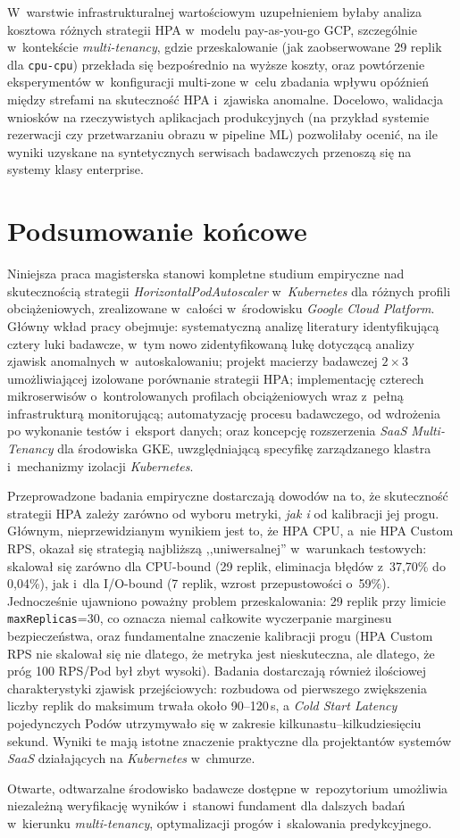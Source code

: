 W~warstwie infrastrukturalnej wartościowym uzupełnieniem byłaby analiza kosztowa różnych strategii HPA w~modelu pay-as-you-go GCP, szczególnie w~kontekście \textit{multi-tenancy}, gdzie przeskalowanie (jak zaobserwowane 29 replik dla \texttt{cpu-cpu}) przekłada się bezpośrednio na wyższe koszty, oraz powtórzenie eksperymentów w~konfiguracji multi-zone w~celu zbadania wpływu opóźnień między strefami na skuteczność HPA i~zjawiska anomalne. Docelowo, walidacja wniosków na rzeczywistych aplikacjach produkcyjnych (na przykład systemie rezerwacji czy przetwarzaniu obrazu w pipeline ML) pozwoliłaby ocenić, na ile wyniki uzyskane na syntetycznych serwisach badawczych przenoszą się na systemy klasy enterprise.

\section{Podsumowanie końcowe}

Niniejsza praca magisterska stanowi kompletne studium empiryczne nad skutecznością strategii \textit{HorizontalPodAutoscaler} w~\textit{Kubernetes} dla różnych profili obciążeniowych, zrealizowane w~całości w~środowisku \textit{Google Cloud Platform}. Główny wkład pracy obejmuje: systematyczną analizę literatury identyfikującą cztery luki badawcze, w~tym nowo zidentyfikowaną lukę dotyczącą analizy zjawisk anomalnych w~autoskalowaniu; projekt macierzy badawczej $2 \times 3$ umożliwiającej izolowane porównanie strategii HPA; implementację czterech mikroserwisów o~kontrolowanych profilach obciążeniowych wraz z~pełną infrastrukturą monitorującą; automatyzację procesu badawczego, od wdrożenia po wykonanie testów i~eksport danych; oraz koncepcję rozszerzenia \textit{SaaS Multi-Tenancy} dla środowiska GKE, uwzględniającą specyfikę zarządzanego klastra i~mechanizmy izolacji \textit{Kubernetes}.

Przeprowadzone badania empiryczne dostarczają dowodów na to, że skuteczność strategii HPA zależy zarówno od wyboru metryki, \textit{jak i} od kalibracji jej progu. Głównym, nieprzewidzianym wynikiem jest to, że HPA CPU, a~nie HPA Custom RPS, okazał się strategią najbliższą ,,uniwersalnej'' w~warunkach testowych: skalował się zarówno dla CPU-bound (29 replik, eliminacja błędów z~37,70\% do 0,04\%), jak i~dla I/O-bound (7 replik, wzrost przepustowości o~59\%). Jednocześnie ujawniono poważny problem przeskalowania: 29 replik przy limicie \texttt{maxReplicas}=30, co oznacza niemal całkowite wyczerpanie marginesu bezpieczeństwa, oraz fundamentalne znaczenie kalibracji progu (HPA Custom RPS nie skalował się nie dlatego, że metryka jest nieskuteczna, ale dlatego, że próg 100 RPS/Pod był zbyt wysoki). Badania dostarczają również ilościowej charakterystyki zjawisk przejściowych: rozbudowa od pierwszego zwiększenia liczby replik do maksimum trwała około 90--120\,s, a \textit{Cold Start Latency} pojedynczych Podów utrzymywało się w zakresie kilkunastu--kilkudziesięciu sekund. Wyniki te mają istotne znaczenie praktyczne dla projektantów systemów \textit{SaaS} działających na \textit{Kubernetes} w~chmurze.

Otwarte, odtwarzalne środowisko badawcze dostępne w~repozytorium umożliwia niezależną weryfikację wyników i~stanowi fundament dla dalszych badań w~kierunku \textit{multi-tenancy}, optymalizacji progów i~skalowania predykcyjnego.
